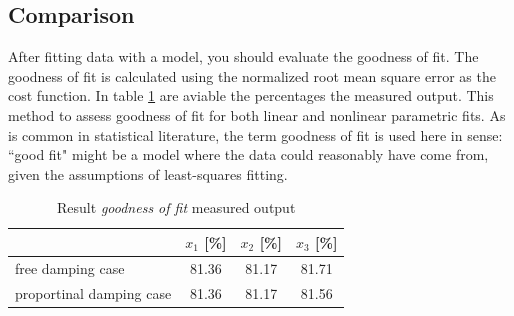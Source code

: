 \subsection{Comparison}
\label{subsec:comparison}
After fitting data with a model, you should evaluate the goodness of fit. 
The goodness of fit is calculated using the normalized root mean square error 
as the cost function.
In table \ref{tab:goodoffit} are aviable the percentages the measured output.
This method to assess goodness of fit for both linear and nonlinear parametric 
fits.
As is common in statistical literature, the term goodness of fit is used here 
in sense:  ``good fit" might be a model where the data could reasonably have 
come from, given the assumptions of least-squares fitting.
\begin{table}[ht]
\centering
\begin{tabular}{lccc}
	\toprule
		 & $x_1$ [\%] & $x_2$ [\%] & $x_3$ [\%]\\
	\midrule
	free damping case & 81.36 & 81.17 & 81.71 \\
	proportinal damping case & 81.36 & 81.17 & 81.56 \\
	\bottomrule
\end{tabular}
\caption{Result \emph{goodness of fit} measured output}
\label{tab:goodoffit}
\end{table}
%
%
%
%
%
%
%
%
%
